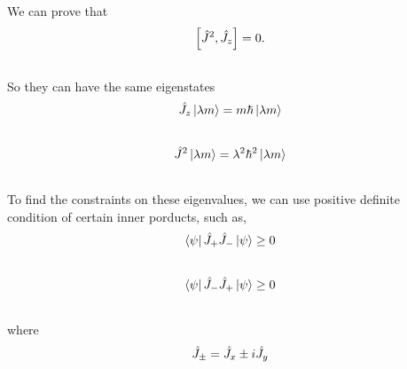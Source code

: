 \documentclass[letterpaper,10pt,english]{sphinxmanual}
\newcommand{\bra}[1]{\left\langle #1\right|}
\newcommand{\ket}[1]{\left| #1\right\rangle}
\begin{document}
We can prove that
\begin{gather}
\begin{split}\left[ \hat J^2,\hat J_z \right] = 0.\end{split}\notag\\\begin{split}\end{split}\notag
\end{gather}
So they can have the same eigenstates
\begin{gather}
\begin{split}\hat J_z \ket{\lambda m} = m\hbar \ket{\lambda m}\end{split}\notag\\\begin{split}\end{split}\notag
\end{gather}\begin{gather}
\begin{split}\hat J^2 \ket{\lambda m} = \lambda^2 \hbar^2 \ket{\lambda m}\end{split}\notag\\\begin{split}\end{split}\notag
\end{gather}
To find the constraints on these eigenvalues, we can use positive definite condition of certain inner porducts, such as,
\begin{gather}
\begin{split}\bra{\psi} \hat J_+ \hat J_- \ket{\psi} \geq 0\end{split}\notag\\\begin{split}\end{split}\notag
\end{gather}\begin{gather}
\begin{split}\bra{\psi} \hat J_- \hat J_+ \ket{\psi} \geq 0\end{split}\notag\\\begin{split}\end{split}\notag
\end{gather}
where
\begin{gather}
\begin{split}\hat J_{\pm} = \hat J_x \pm i \hat J_y\end{split}\notag\\\begin{split}\end{split}\notag
\end{gather}
\end{document}
